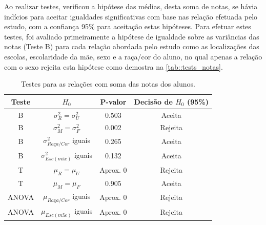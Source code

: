Ao realizar testes, verificou a hipótese das médias, desta soma de notas, se hávia indícios para aceitar
igualdades significativas com base nas relação efetuada pelo estudo, com a confiança 95\% para
aceitação estas hipóteses.
Para efetuar estes testes, foi avaliado primeiramente a hipótese de igualdade sobre as variâncias
das notas (Teste B) para cada relação abordada pelo estudo como as localizações das escolas, 
escolaridade da mãe, sexo e a raça/cor do aluno, no qual apenas a relação com o sexo rejeita esta hipótese
como demostra na \autoref{tab::tests_notas}.

\newpage
\begin{table}[htb]
\caption{Testes para as relações com soma
 das notas dos alunos.\label{tab::tests_notas}}
    \centering
    \begin{tabular}{cccc}
    \toprule
    Teste & $H_0$& P-valor & Decisão de $H_0$ (95\%)\\
    \midrule \midrule
    B & $\sigma_R^2 = \sigma_U^2$ & 0.503 & Aceita\\
    B & $\sigma_M^2 = \sigma_F^2$ & 0.002 & Rejeita\\
    B & $\sigma_{Raça/Cor}^2$ iguais & 0.265 & Aceita\\
    B & $\sigma_{Esc(mãe)}^2$ iguais & 0.132 & Aceita\\
    T & $\mu_R = \mu_U$ & Aprox. 0 & Rejeita\\
    T & $\mu_M = \mu_F$ & 0.905 & Aceita\\
    ANOVA & $\mu_{Raça/Cor}$ iguais & Aprox. 0 & Rejeita\\
    ANOVA & $\mu_{Esc(mãe)}$ iguais & Aprox. 0 & Rejeita\\
    \bottomrule
    \end{tabular}
\end{table}

